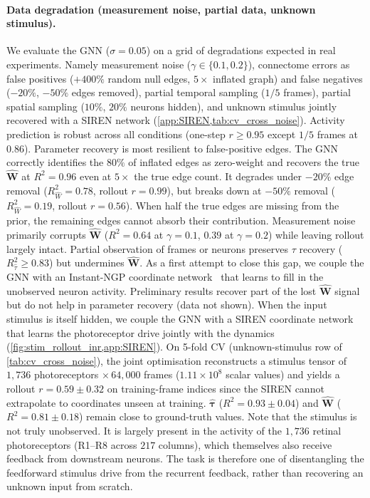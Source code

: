\documentclass{article}
\begin{document}
\paragraph{Data degradation (measurement noise, partial data, unknown stimulus).}
We evaluate the GNN ($\sigma=0.05$) on a grid of degradations expected in real experiments. Namely measurement noise ($\gamma\in\{0.1,0.2\}$), connectome errors as false positives ($+400\%$ random null edges, $5\times$ inflated graph) and false negatives ($-20\%$, $-50\%$ edges removed), partial temporal sampling ($1/5$ frames), partial spatial sampling ($10\%$, $20\%$ neurons hidden), and unknown stimulus jointly recovered with a SIREN network (\cref{app:SIREN,tab:cv_cross_noise}). Activity prediction is robust across all conditions (one-step $r\geq0.95$ except $1/5$ frames at $0.86$). Parameter recovery is most resilient to false-positive edges. The GNN correctly identifies the $80\%$ of inflated edges as zero-weight and recovers the true $\hat{\mathbf{W}}$ at $R^2=0.96$ even at $5\times$ the true edge count. It degrades under $-20\%$ edge removal ($R^2_{\hat{W}}=0.78$, rollout $r=0.99$), but breaks down at $-50\%$ removal ($R^2_{\hat{W}}=0.19$, rollout $r=0.56$). When half the true edges are missing from the prior, the remaining edges cannot absorb their contribution. Measurement noise primarily corrupts $\hat{\mathbf{W}}$ ($R^2=0.64$ at $\gamma=0.1$, $0.39$ at $\gamma=0.2$) while leaving rollout largely intact. Partial observation of frames or neurons preserves $\tau$ recovery ($R^2_{\hat\tau}\geq0.83$) but undermines $\hat{\mathbf{W}}$. As a first attempt to close this gap, we couple the GNN with an Instant\nobreakdash-NGP coordinate network~\citep{muller_instant_2022} that learns to fill in the unobserved neuron activity. Preliminary results recover part of the lost $\hat{\mathbf{W}}$ signal but do not help in parameter recovery (data not shown). When the input stimulus is itself hidden, we couple the GNN with a SIREN coordinate network~\citep{sitzmann_implicit_2020} that learns the photoreceptor drive jointly with the dynamics (\cref{fig:stim_rollout_inr,app:SIREN}). On 5-fold CV (unknown-stimulus row of \cref{tab:cv_cross_noise}), the joint optimisation reconstructs a stimulus tensor of $1{,}736$ photoreceptors $\times\,64{,}000$ frames ($1.11\!\times\!10^{8}$ scalar values) and yields a rollout $r=0.59\pm 0.32$ on training-frame indices since the SIREN cannot extrapolate to coordinates unseen at training. $\hat{\boldsymbol{\tau}}$ ($R^2=0.93\pm 0.04$) and $\hat{\mathbf{W}}$ ($R^2=0.81\pm 0.18$) remain close to ground-truth values. Note that the stimulus is not truly unobserved. It is largely present in the activity of the $1{,}736$ retinal photoreceptors (R1--R8 across $217$ columns), which themselves also receive feedback from downstream neurons. The task is therefore one of disentangling the feedforward stimulus drive from the recurrent feedback, rather than recovering an unknown input from scratch.
\end{document}
